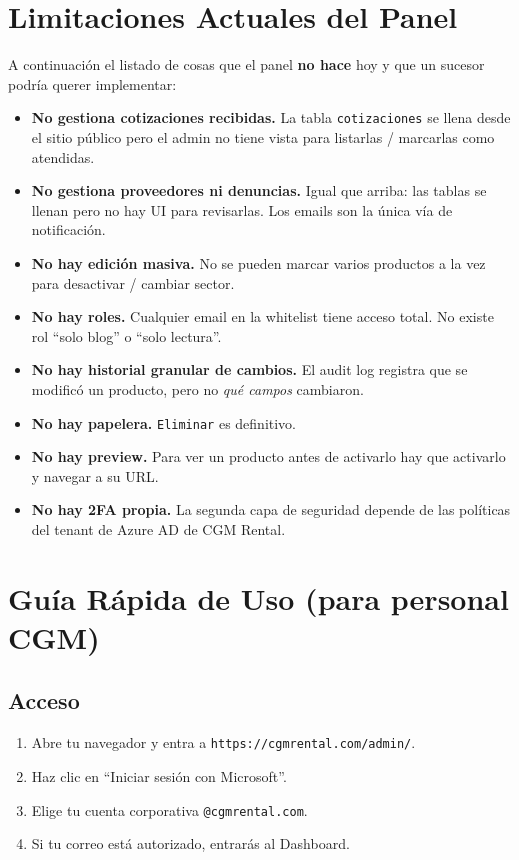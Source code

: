 \documentclass[11pt,a4paper]{article}
\begin{document}
\section{Limitaciones Actuales del Panel}

A continuación el listado de cosas que el panel \textbf{no hace} hoy y
que un sucesor podría querer implementar:

\begin{itemize}[leftmargin=*]
    \item \textbf{No gestiona cotizaciones recibidas.} La tabla
        \texttt{cotizaciones} se llena desde el sitio público pero el
        admin no tiene vista para listarlas / marcarlas como atendidas.
    \item \textbf{No gestiona proveedores ni denuncias.} Igual que arriba:
        las tablas se llenan pero no hay UI para revisarlas. Los emails
        son la única vía de notificación.
    \item \textbf{No hay edición masiva.} No se pueden marcar varios
        productos a la vez para desactivar / cambiar sector.
    \item \textbf{No hay roles.} Cualquier email en la whitelist tiene
        acceso total. No existe rol ``solo blog'' o ``solo lectura''.
    \item \textbf{No hay historial granular de cambios.} El audit log
        registra que se modificó un producto, pero no \textit{qué campos}
        cambiaron.
    \item \textbf{No hay papelera.} \texttt{Eliminar} es definitivo.
    \item \textbf{No hay preview.} Para ver un producto antes de
        activarlo hay que activarlo y navegar a su URL.
    \item \textbf{No hay 2FA propia.} La segunda capa de seguridad
        depende de las políticas del tenant de Azure AD de CGM Rental.
\end{itemize}

\section{Guía Rápida de Uso (para personal CGM)}

\subsection{Acceso}
\begin{enumerate}[leftmargin=*]
    \item Abre tu navegador y entra a
        \texttt{https://cgmrental.com/admin/}.
    \item Haz clic en ``Iniciar sesión con Microsoft''.
    \item Elige tu cuenta corporativa \texttt{@cgmrental.com}.
    \item Si tu correo está autorizado, entrarás al Dashboard.
\end{enumerate}
\end{document}
